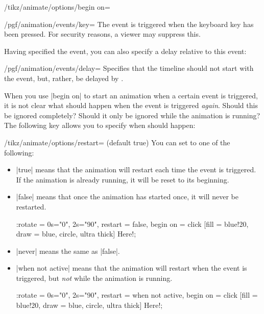 \begin{key}{/tikz/animate/options/begin on=}
    \begin{key}{/pgf/animation/events/key=}
        The event is triggered when the keyboard key  has been
        pressed. For security reasons, a viewer may suppress this.
    \end{key}

    Having specified the event, you can also specify a delay relative to this
    event:

    \begin{key}{/pgf/animation/events/delay=}
        Specifies that the timeline should not start with the event, but,
        rather, be delayed by .
    \end{key}
\end{key}

When you use |begin on| to start an animation when a certain event is
triggered, it is not clear what should happen when the event is triggered
\emph{again}. Should this be ignored completely? Should it only be ignored
while the animation is running? The following key allows you to specify when
should happen:

\begin{key}{/tikz/animate/options/restart= (default true)}
    You can set  to one of the following:
    \begin{itemize}
        \item |true| means that the animation will restart each time the event
            is triggered. If the animation is already running, it will be reset
            to its beginning.
        \item |false| means that once the animation has started once, it will
            never be restarted.
\begin{codeexample}[width=2cm,preamble={\usetikzlibrary{animations}}]
\tikz \node :rotate = { 0s="0", 2s="90",
                        restart = false, begin on = {click}}
    [fill = blue!20, draw = blue, circle, ultra thick] {Here!};
\end{codeexample}
        \item |never| means the same as |false|.
        \item |when not active| means that the animation will restart when the
            event is triggered, but \emph{not} while the animation is running.
\begin{codeexample}[width=2cm,preamble={\usetikzlibrary{animations}}]
\tikz \node :rotate = { 0s="0", 2s="90",
                        restart = when not active, begin on = {click}}
    [fill = blue!20, draw = blue, circle, ultra thick] {Here!};
\end{codeexample}
    \end{itemize}
\end{key}

